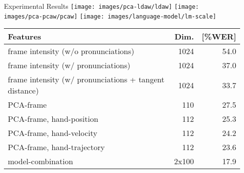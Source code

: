 \documentclass[final,t]{beamer}
\begin{document}
\begin{frame}{}
\begin{columns}[t]
\begin{column}{.3\linewidth}
    \end{column}

    
    \begin{column}{.3\linewidth}

      \begin{block}{Experimental Results}
        \centering
        \texttt{[image: images/pca-ldaw/ldaw]}%
        \texttt{[image: images/pca-pcaw/pcaw]}%
        \texttt{[image: images/language-model/lm-scale]}%

        \begin{table}
          \centering
          \begin{tabular}{@{} p{.7\linewidth} r r @{}}
            \toprule
            Features                                                             & Dim.            & [\%WER] \\
            \midrule
            frame intensity (w/o pronunciations)                                 & 1024            & 54.0    \\%
            frame intensity (w/ pronunciations)                                  & 1024            & 37.0    \\
            frame intensity (w/ pronunciations + tangent distance)               & 1024            & 33.7    \\%
            PCA-frame                                                            & 110             & 27.5    \\
            PCA-frame, hand-position                                             & 112             & 25.3    \\
            PCA-frame, hand-velocity                                             & 112             & 24.2    \\
            PCA-frame, hand-trajectory                                           & 112             & 23.6    \\
            \addlinespace
            \addlinespace
            model-combination                                                    & 2x100           & 17.9    \\
            \bottomrule
          \end{tabular}
          \label{tab:baseline-results}
        \end{table}
      \end{block}
      

\end{column}
\end{columns}
\end{frame}
\end{document}
